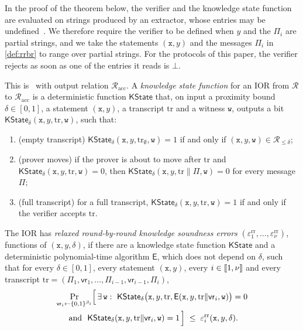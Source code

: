 In the proof of the theorem below, the verifier and the knowledge state function are evaluated on strings produced by an extractor, whose entries may be undefined~\cite[Constructions~11.8 and~11.9]{CDHZ25}.
We therefore require the verifier to be defined when $y$ and the $\Pi_i$ are partial strings, and we take the statements $(\mathtt{x}, y)$ and the messages $\Pi_i$ in \cref{def:rrbr} to range over partial strings.
For the protocols of this paper, the verifier rejects as soon as one of the entries it reads is $\bot$.

\begin{definition}\label{def:rrbr}
This is~\cite[Definitions~3.5 and~3.6]{CDHZ25} with output relation $\mathcal{R}_{\mathrm{acc}}$.
A \emph{knowledge state function} for an IOR from $\mathcal{R}$ to $\mathcal{R}_{\mathrm{acc}}$ is a deterministic function $\mathsf{KState}$ that, on input a proximity bound $\delta \in [0,1]$, a statement $(\mathtt{x}, y)$, a transcript $\mathrm{tr}$ and a witness $\mathtt{w}$, outputs a bit $\mathsf{KState}_\delta(\mathtt{x}, y, \mathrm{tr}, \mathtt{w})$, such that:
\begin{enumerate}
  \item (empty transcript) $\mathsf{KState}_\delta(\mathtt{x}, y, \mathrm{tr}_\emptyset, \mathtt{w}) = 1$ if and only if $(\mathtt{x}, y, \mathtt{w}) \in \mathcal{R}_{\le\delta}$;
  \item (prover moves) if the prover is about to move after $\mathrm{tr}$ and $\mathsf{KState}_\delta(\mathtt{x}, y, \mathrm{tr}, \mathtt{w}) = 0$, then $\mathsf{KState}_\delta(\mathtt{x}, y, \mathrm{tr} \| \Pi, \mathtt{w}) = 0$ for every message $\Pi$;
  \item (full transcript) for a full transcript, $\mathsf{KState}_\delta(\mathtt{x}, y, \mathrm{tr}, \mathtt{w}) = 1$ if and only if the verifier accepts $\mathrm{tr}$.
\end{enumerate}
The IOR has \emph{relaxed round-by-round knowledge soundness errors} $(\varepsilon^{\mathrm{rr}}_1, \dots, \varepsilon^{\mathrm{rr}}_\nu)$, functions of $(\mathtt{x}, y, \delta)$, if there are a knowledge state function $\mathsf{KState}$ and a deterministic polynomial-time algorithm $\mathsf{E}$, which does not depend on $\delta$, such that for every $\delta \in [0,1]$, every statement $(\mathtt{x}, y)$, every $i \in \llbracket 1, \nu \rrbracket$ and every transcript $\mathrm{tr} = (\Pi_1, \mathsf{vr}_1, \dots, \Pi_{i-1}, \mathsf{vr}_{i-1}, \Pi_i)$,
\begin{multline*}
  \Pr_{\mathsf{vr}_i \leftarrow \{0,1\}^{\beta_i}}\Bigl[\, \exists\, \mathtt{w} :\ \mathsf{KState}_\delta\bigl(\mathtt{x}, y, \mathrm{tr}, \mathsf{E}(\mathtt{x}, y, \mathrm{tr}\|\mathsf{vr}_i, \mathtt{w})\bigr) = 0 \\
  \text{ and } \ \mathsf{KState}_\delta(\mathtt{x}, y, \mathrm{tr}\|\mathsf{vr}_i, \mathtt{w}) = 1 \,\Bigr] \;\le\; \varepsilon^{\mathrm{rr}}_i(\mathtt{x}, y, \delta).
\end{multline*}
\end{definition}


